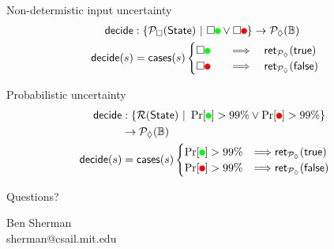 \documentclass[14pt, notes]{beamer}
\newcommand{\PLower}{\mathcal{P}_\lozenge}
\newcommand{\PUpper}{\mathcal{P}_\square}
\newcommand{\Prob}{\mathcal{R}}
\newcommand{\State}{\mathsf{State}}
\newcommand{\suchthat}{\ |\ }
\newcommand{\bool}{\mathbb{B}}
\newcommand{\ret}[1]{\mathsf{ret}_{#1}}
\newcommand*{\tikzbullet}[2]{%
  \setbox0=\hbox{\strut}%
  \begin{tikzpicture}
    \useasboundingbox (-.25em,0) rectangle (.25em,\ht0);
    \filldraw[draw=#1,fill=#2] (0,0.3\ht0) circle[radius=.25em];
  \end{tikzpicture}%
}
\newcommand{\SafeToGo}{\tikzbullet{green}{green}}
\newcommand{\SafeToStop}{\tikzbullet{red}{red}}
\begin{document}
\begin{frame}{Non-determistic input uncertainty}
\begin{align*}
\mathsf{decide} &: \{ \PUpper(\State) \suchthat \square \SafeToGo \vee \square \SafeToStop \} \to \PLower(\bool)
\\ \mathsf{decide}(s) &= \mathsf{cases}(s)
\begin{cases}
\square \SafeToGo
  \quad &\Longrightarrow \quad
  \ret{\PLower}(\mathsf{true})
\\
\square \SafeToStop
  \quad &\Longrightarrow \quad
  \ret{\PLower}(\mathsf{false})
\end{cases}
\end{align*}
\end{frame}

\begin{frame}{Probabilistic uncertainty}
\begin{align*}
\mathsf{decide} &: \{ \Prob(\State) \suchthat \Pr[\SafeToGo] > 99\% \vee \Pr[\SafeToStop] > 99\% \} 
\\ &\to \PLower(\bool)
\\ \mathsf{decide}(s) &= \mathsf{cases}(s)
\begin{cases}
\Pr[\SafeToGo] > 99\%
   &\Longrightarrow
  \ret{\PLower}(\mathsf{true})
\\
\Pr[\SafeToStop] > 99\%
   &\Longrightarrow
  \ret{\PLower}(\mathsf{false})
\end{cases}
\end{align*}
\end{frame}

\begin{frame}
\begin{center}
\Huge Questions?

\vspace{3em}

\small Ben Sherman
\\ sherman@csail.mit.edu
\end{center}
\end{frame}
\end{document}
